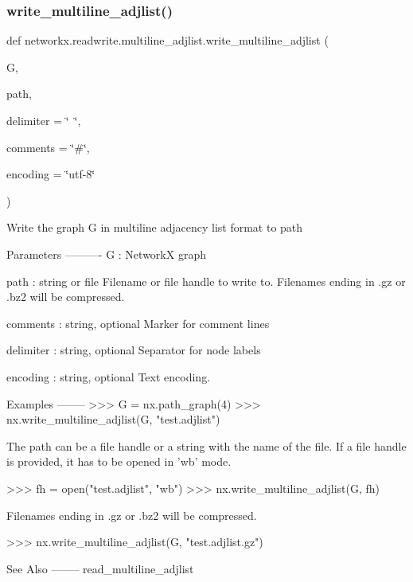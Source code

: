 \subsubsection{\texorpdfstring{write\+\_\+multiline\+\_\+adjlist()}{write\_multiline\_adjlist()}}
{\footnotesize\ttfamily def networkx.\+readwrite.\+multiline\+\_\+adjlist.\+write\+\_\+multiline\+\_\+adjlist (\begin{DoxyParamCaption}\item[{}]{G,  }\item[{}]{path,  }\item[{}]{delimiter = {\ttfamily \char`\"{}~\char`\"{}},  }\item[{}]{comments = {\ttfamily \char`\"{}\#\char`\"{}},  }\item[{}]{encoding = {\ttfamily \char`\"{}utf-\/8\char`\"{}} }\end{DoxyParamCaption})}

\begin{DoxyVerb}Write the graph G in multiline adjacency list format to path

Parameters
----------
G : NetworkX graph

path : string or file
   Filename or file handle to write to.
   Filenames ending in .gz or .bz2 will be compressed.

comments : string, optional
   Marker for comment lines

delimiter : string, optional
   Separator for node labels

encoding : string, optional
   Text encoding.

Examples
--------
>>> G = nx.path_graph(4)
>>> nx.write_multiline_adjlist(G, "test.adjlist")

The path can be a file handle or a string with the name of the file. If a
file handle is provided, it has to be opened in 'wb' mode.

>>> fh = open("test.adjlist", "wb")
>>> nx.write_multiline_adjlist(G, fh)

Filenames ending in .gz or .bz2 will be compressed.

>>> nx.write_multiline_adjlist(G, "test.adjlist.gz")

See Also
--------
read_multiline_adjlist
\end{DoxyVerb}
 